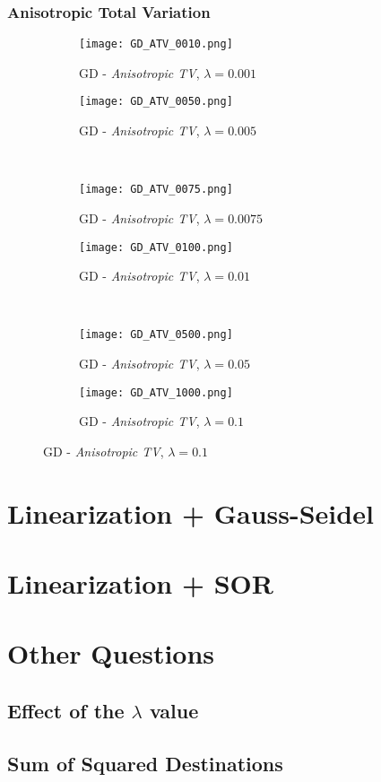 \documentclass{report}
\begin{document}
			\subsubsection*{Anisotropic Total Variation}
			\begin{figure}[H] \renewcommand\thesubfigure{GD.ATV.\arabic{subfigure}}
				\centering
				\begin{subfigure}[b]{0.45\textwidth}
					\texttt{[image: GD\_ATV\_0010.png]}
					\caption{GD - \textit{Anisotropic TV}, $\lambda = 0.001$}
					\label{fig:GD_ATV001}
				\end{subfigure}
				\begin{subfigure}[b]{0.45\textwidth}
					\texttt{[image: GD\_ATV\_0050.png]}
					\caption{GD - \textit{Anisotropic TV}, $\lambda = 0.005$}
					\label{fig:GD_ATV005}
				\end{subfigure}
				\\
				\centering
				\begin{subfigure}[b]{0.45\textwidth}
					\texttt{[image: GD\_ATV\_0075.png]}
					\caption{GD - \textit{Anisotropic TV}, $\lambda = 0.0075$}
					\label{fig:GD_ATV0075}
				\end{subfigure}
				\begin{subfigure}[b]{0.45\textwidth}
					\texttt{[image: GD\_ATV\_0100.png]}
					\caption{GD - \textit{Anisotropic TV}, $\lambda = 0.01$}
					\label{fig:GD_ATV01}
				\end{subfigure}
				\\
				\centering
				\begin{subfigure}[b]{0.45\textwidth}
					\texttt{[image: GD\_ATV\_0500.png]}
					\caption{GD - \textit{Anisotropic TV}, $\lambda = 0.05$}
					\label{fig:GD_ATV05}
				\end{subfigure}
				\begin{subfigure}[b]{0.45\textwidth}
					\texttt{[image: GD\_ATV\_1000.png]}
					\caption{GD - \textit{Anisotropic TV}, $\lambda = 0.1$}
					\label{fig:GD_ATV1}
				\end{subfigure}
			\end{figure}
		\closesection
	\closesection
	\newpage
	
	\section{Linearization + Gauss-Seidel}
	\startsection
	\closesection
	
	\section{Linearization + SOR}
	\startsection
	\closesection
	
	\section{Other Questions}
	\startsection
		\subsection{Effect of the $\lambda$ value}
		\startsubsection
		\closesection
		\subsection{Sum of Squared Destinations}
		\startsubsection
		\closesection
	\closesection
\end{document}
